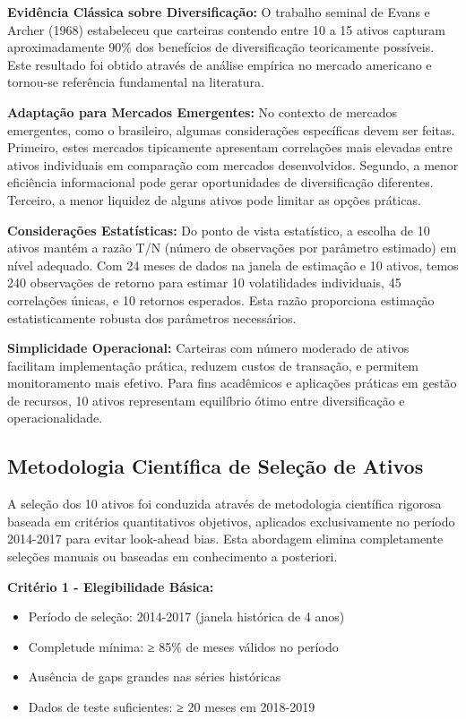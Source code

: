 \textbf{Evidência Clássica sobre Diversificação:} O trabalho seminal de Evans e Archer (1968) estabeleceu que carteiras contendo entre 10 a 15 ativos capturam aproximadamente 90\% dos benefícios de diversificação teoricamente possíveis. Este resultado foi obtido através de análise empírica no mercado americano e tornou-se referência fundamental na literatura.

\textbf{Adaptação para Mercados Emergentes:} No contexto de mercados emergentes, como o brasileiro, algumas considerações específicas devem ser feitas. Primeiro, estes mercados tipicamente apresentam correlações mais elevadas entre ativos individuais em comparação com mercados desenvolvidos. Segundo, a menor eficiência informacional pode gerar oportunidades de diversificação diferentes. Terceiro, a menor liquidez de alguns ativos pode limitar as opções práticas.

\textbf{Considerações Estatísticas:} Do ponto de vista estatístico, a escolha de 10 ativos mantém a razão T/N (número de observações por parâmetro estimado) em nível adequado. Com 24 meses de dados na janela de estimação e 10 ativos, temos 240 observações de retorno para estimar 10 volatilidades individuais, 45 correlações únicas, e 10 retornos esperados. Esta razão proporciona estimação estatisticamente robusta dos parâmetros necessários.

\textbf{Simplicidade Operacional:} Carteiras com número moderado de ativos facilitam implementação prática, reduzem custos de transação, e permitem monitoramento mais efetivo. Para fins acadêmicos e aplicações práticas em gestão de recursos, 10 ativos representam equilíbrio ótimo entre diversificação e operacionalidade.

\subsection{Metodologia Científica de Seleção de Ativos}

A seleção dos 10 ativos foi conduzida através de metodologia científica rigorosa baseada em critérios quantitativos objetivos, aplicados exclusivamente no período 2014-2017 para evitar look-ahead bias. Esta abordagem elimina completamente seleções manuais ou baseadas em conhecimento a posteriori.

\textbf{Critério 1 - Elegibilidade Básica:}
\begin{itemize}
    \item Período de seleção: 2014-2017 (janela histórica de 4 anos)
    \item Completude mínima: ≥ 85\% de meses válidos no período
    \item Ausência de gaps grandes nas séries históricas
    \item Dados de teste suficientes: ≥ 20 meses em 2018-2019
\end{itemize}

